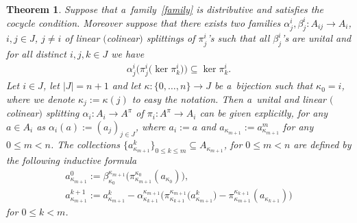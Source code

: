 \documentclass[11pt]{article}
\newtheorem{theorem}{Theorem}
\begin{document}
\begin{theorem}
\label{main-split}
Suppose that a~family~\eqref{family} is distributive and satisfies the cocycle condition.
Moreover suppose that there exists two families $\alpha^i_j,\beta^i_j:A_{ij}\rightarrow A_i$, $i,j\in J$,
$j\neq i$ of linear $($colinear$)$ splittings of $\pi^i_j$'s such that all $\beta^i_j$'s are unital and for all distinct
$i,j,k\in J$ we have
\begin{gather}
\label{thkercond}
\alpha^i_j\big(\pi^i_j\big(\ker\pi^i_k\big)\big)\subseteq\ker\pi^i_k.
\end{gather}
Let $i\in J$, let $|J|=n+1$ and let $\kappa:\{0,\ldots,n\}\rightarrow J$ be a~bijection such that $\kappa_0=i$, where we
denote $\kappa_j:=\kappa(j)$ to easy the notation.
Then a~unital and linear $($colinear$)$ splitting $\alpha_i:A_i\rightarrow A^\pi$ of $\pi_i:A^\pi\rightarrow A_i$ can be
given explicitly, for any $a\in A_i$ as $\alpha_i(a):=(a_j)_{j\in J}$, where $a_i:=a$ and
$a_{\kappa_{m+1}}:=a^m_{\kappa_{m+1}}$ for any $0\leq m<n$.
The collections $\{a^k_{\kappa_{m+1}}\}_{0\leq k\leq m}\subseteq A_{\kappa_{m+1}}$, for $0\leq m<n$ are defined by the
following inductive formula
\begin{gather}
a^0_{\kappa_{m+1}}:=\beta^{\kappa_{m+1}}_{\kappa_0}\big(\pi^{\kappa_0}_{\kappa_{m+1}}(a_{\kappa_0})\big),
\nonumber
\\
a^{k+1}_{\kappa_{m+1}}:=a_{\kappa_{m+1}}^k-\alpha^{\kappa_{m+1}}_{\kappa_{k+1}}
\big(\pi^{\kappa_{m+1}}_{\kappa_{k+1}}\big(a^k_{\kappa_{m+1}}\big)-\pi^{\kappa_{k+1}}_{\kappa_{m+1}}(a_{\kappa_{k+1}})\big)
\label{recsplitform}
\end{gather}
for $0\leq k<m$.
\end{theorem}
\end{document}
